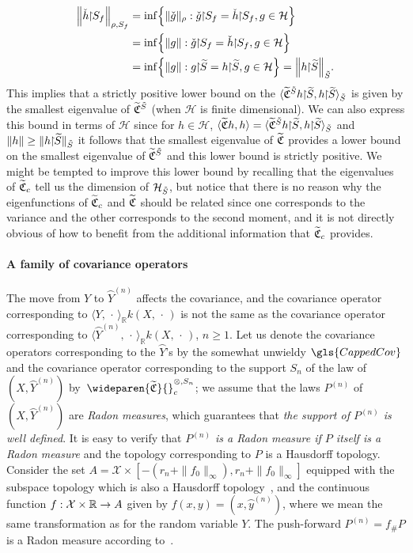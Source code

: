 \documentclass[AHL,Unicode,longabstracts,published]{cedram}
\theoremstyle{remark}
\newcommand{\restrr}
{\!\!\upharpoonright\!\!}
\newcommand{\R}{\mathbb{R}}
\newcommand{\X}{\mathcal{X}}
\newcommand{\cH}{\mathcal{H}}
\newcommand{\fkC}{\mathfrak{C}}
\newcommand{\Cov}{\tilde{\fkC}}
\newcommand{\CovCapn}{\wideparen{\widetilde{\fkC}}{\vphantom{\fkC}}^{\otimes,S_n}_c}
\let\oldtilde\tilde
\renewcommand*{\tilde}[1]{\mathchoice{\widetilde{#1}}{\widetilde{#1}}{\oldtilde{#1}}{\oldtilde{#1}}}
\renewcommand*{\to}{\mathchoice{\longrightarrow}{\rightarrow}{\rightarrow}{\rightarrow}}
\let\originalleft\left
\let\originalright\right
\renewcommand{\left}{\mathopen{}\mathclose\bgroup\originalleft}
\renewcommand{\right}{\aftergroup\egroup\originalright}
\begin{document}
\begin{equation}\label{eq:check_h_S}
\begin{aligned}[t]
\left\| \check h \restrr S_f \right\|_{\rho,S_f}
&= \inf\left\{ \|\check g \|_{\rho} : \check g \restrr S_f = \check h \restrr S_f, g \in \cH \right\}\\
&= \inf\left\{ \|g \| : \check g \restrr S_f = \check h \restrr S_f, g \in \cH \right\} \\
&= \inf\left\{ \|g \| : g \restrr \tilde S = h \restrr \tilde S, g \in \cH \right\} = \left\| h \restrr \tilde S\right\|_{\tilde S}.
\end{aligned}
\end{equation}
This implies that a strictly positive lower bound on the $\langle \Cov^{\tilde S} h \restrr \tilde S, h \restrr \tilde S \rangle_{\tilde S}$ is given by the smallest eigenvalue of $\Cov^{\tilde S}$ (when $\cH$ is finite dimensional). We can also express this bound in terms of $\cH$ since for $h \in \cH$, $\langle \Cov h, h \rangle = \langle \Cov^{\tilde S} h \restrr \tilde S, h \restrr \tilde S \rangle_{\tilde S}$ and $\|h\| \geq \|h \restrr \tilde S \|_{\tilde S}$ it follows that the smallest eigenvalue of $\Cov$ provides a lower bound on the smallest eigenvalue of $\Cov^{\tilde S}$ and this lower bound is strictly positive. We might be tempted to improve this lower bound by recalling that the eigenvalues of $\Cov_c$ tell us the dimension of $\cH_{\tilde S}$, but notice that there is no reason why the eigenfunctions of $\Cov_c$ and $\Cov$ should be related since one corresponds to the variance and the other corresponds to the second moment, and it is not directly obvious of how to benefit from the additional information that $\Cov_c$ provides.

\paragraph{A family of covariance operators}
The move from $Y$ to $\wideparen{Y}^{(n)}$ affects the covariance, and the covariance operator corresponding to $\langle Y, \,\cdot\, \rangle_\R k(X,\,\cdot\,)$ is not the same as the covariance operator corresponding to $\langle \wideparen{Y}^{(n)}, \,\cdot\, \rangle_\R k(X,\,\cdot\,)$, $n\geq 1$. Let us denote the covariance operators corresponding to the $\wideparen{Y}$'s by the somewhat unwieldy $\gls{CappedCov}$ and the covariance operator corresponding to the support $S_n$ of the law of $(X,\wideparen{Y}^{(n)})$ by~$\CovCapn$; we assume that the laws $P^{(n)}$ of $(X,\wideparen{Y}^{(n)})$ are \emph{Radon measures}, which guarantees that \emph{the support of $P^{(n)}$ is well defined}. It is easy to verify that \emph{ $P^{(n)}$ is a Radon measure if $P$ itself is a Radon measure} and the topology corresponding to $P$ is a Hausdorff topology. Consider the set $A = \X \times [- (r_n + \|f_0\|_\infty), r_n + \|f_0\|_\infty]$ equipped with the subspace topology which is also a Hausdorff topology~\cite[Theorem~2.1.6]{ENG89}, and the continuous function $f: \X \times \R \to A$ given by $f(x,y) = (x, \wideparen{y}^{(n)})$, where we mean the same transformation as for the random variable $Y$. The push-forward $P^{(n)} = f_\# P$ is a Radon measure according to~\cite[418I]{FREM}.
\end{document}
